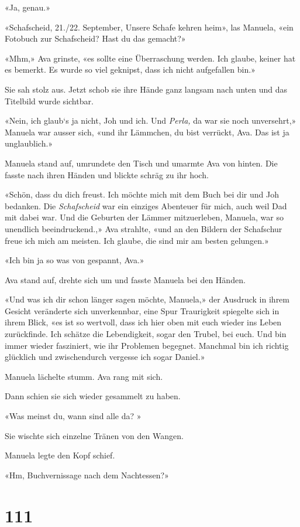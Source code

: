 «Ja, genau.»

«Schafscheid, 21./22. September, Unsere Schafe kehren heim», las
Manuela, «ein Fotobuch zur Schafscheid? Hast du das gemacht?»

«Mhm,» Ava grinste, «es sollte eine Überraschung werden. Ich glaube,
keiner hat es bemerkt. Es wurde so viel geknipst, dass ich nicht
aufgefallen bin.»

Sie sah stolz aus. Jetzt schob sie ihre Hände ganz langsam nach unten
und das Titelbild wurde sichtbar.

«Nein, ich glaub`s ja nicht, Joh und ich. Und \emph{Perla,} da war sie
noch unversehrt,» Manuela war ausser sich, «und ihr Lämmchen, du bist
verrückt, Ava. Das ist ja unglaublich.»

Manuela stand auf, umrundete den Tisch und umarmte Ava von hinten. Die
fasste nach ihren Händen und blickte schräg zu ihr hoch.

«Schön, dass du dich freust. Ich möchte mich mit dem Buch bei dir und
Joh bedanken. Die \emph{Schafscheid} war ein einziges Abenteuer für
mich, auch weil Dad mit dabei war. Und die Geburten der Lämmer
mitzuerleben, Manuela, war so unendlich beeindruckend.,» Ava strahlte,
«und an den Bildern der Schafschur freue ich mich am meisten. Ich
glaube, die sind mir am besten gelungen.»

«Ich bin ja so was von gespannt, Ava.»

Ava stand auf, drehte sich um und fasste Manuela bei den Händen.

«Und was ich dir schon länger sagen möchte, Manuela,» der Ausdruck in
ihrem Gesicht veränderte sich unverkennbar, eine Spur Traurigkeit
spiegelte sich in ihrem Blick, «es ist so wertvoll, dass ich hier oben
mit euch wieder ins Leben zurückfinde. Ich schätze die Lebendigkeit,
sogar den Trubel, bei euch. Und bin immer wieder fasziniert, wie ihr
Problemen begegnet. Manchmal bin ich richtig glücklich und zwischendurch
vergesse ich sogar Daniel.»

Manuela lächelte stumm. Ava rang mit sich.

Dann schien sie sich wieder gesammelt zu haben.

«Was meinst du, wann sind alle da? »

Sie wischte sich einzelne Tränen von den Wangen.

Manuela legte den Kopf schief.

«Hm, Buchvernissage nach dem Nachtessen?»

\chapter{111}\label{section-111}


